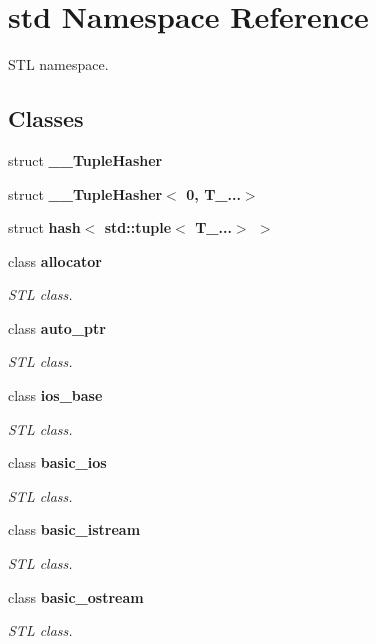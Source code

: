 \hypertarget{namespacestd}{
\section{std Namespace Reference}
\label{namespacestd}
}


STL namespace.  
\subsection*{Classes}
\begin{DoxyCompactItemize}
\item 
struct {\bfseries \_\-\_\-TupleHasher}
\item 
struct {\bfseries \_\-\_\-TupleHasher$<$ 0, T\_\-...$>$}
\item 
struct {\bfseries hash$<$ std::tuple$<$ T\_\-...$>$ $>$}
\item 
class {\bfseries allocator}
\begin{DoxyCompactList}\small\item\em STL class. \item\end{DoxyCompactList}\item 
class {\bfseries auto\_\-ptr}
\begin{DoxyCompactList}\small\item\em STL class. \item\end{DoxyCompactList}\item 
class {\bfseries ios\_\-base}
\begin{DoxyCompactList}\small\item\em STL class. \item\end{DoxyCompactList}\item 
class {\bfseries basic\_\-ios}
\begin{DoxyCompactList}\small\item\em STL class. \item\end{DoxyCompactList}\item 
class {\bfseries basic\_\-istream}
\begin{DoxyCompactList}\small\item\em STL class. \item\end{DoxyCompactList}\item 
class {\bfseries basic\_\-ostream}
\begin{DoxyCompactList}\small\item\em STL class. \item\end{DoxyCompactList}\item 

\end{DoxyCompactItemize}
